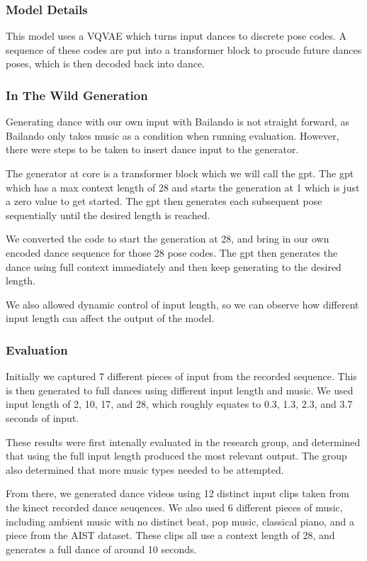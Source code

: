 \documentclass[final,5p,times,authoryear]{article}
\begin{document}
\subsubsection{Model Details}
This model uses a VQVAE which turns input dances to discrete pose codes. A
sequence of these codes are put into a transformer block to procude future
dances poses, which is then decoded back into dance.

\subsubsection{In The Wild Generation}
Generating dance with our own input with Bailando is not straight forward, as
Bailando only takes music as a condition when running evaluation. However, there
were steps to be taken to insert dance input to the generator.

The generator at core is a transformer block which we will call the gpt.
The gpt which has a max context length of 28 and starts the generation at 1
which is just a zero value to get started. The gpt then generates each
subsequent pose sequentially until the desired length is reached.

We converted the code to start the generation at 28, and bring in our own
encoded dance sequence for those 28 pose codes. The gpt then generates the dance
using full context immediately and then keep generating to the desired length.

We also allowed dynamic control of input length, so we can observe how different
input length can affect the output of the model.

\subsubsection{Evaluation}
Initially we captured 7 different pieces of input from the recorded sequence.
This is then generated to full dances using different input length and music. We
used input length of 2, 10, 17, and 28, which roughly equates to 0.3, 1.3, 2.3,
and 3.7 seconds of input.

These results were first intenally evaluated in the research group, and
determined that using the full input length produced the most relevant output.
The group also determined that more music types needed to be attempted.

From there, we generated dance videos using 12 distinct input clips taken from the kinect
recorded dance seuqences. We also used 6 different pieces of music, including
ambient music with no distinct beat, pop music, classical piano, and a piece
from the AIST dataset. These clips all use a context length of 28, and generates
a full dance of around 10 seconds.
\end{document}
